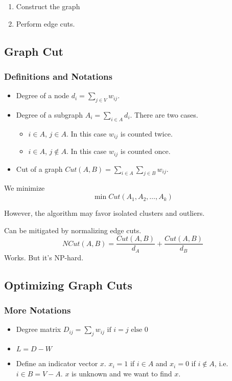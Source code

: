         \begin{enumerate}
            \item Construct the graph
            \item Perform edge cuts.
        \end{enumerate}

    \subsection{Graph Cut}
        \subsubsection{Definitions and Notations}
            \begin{itemize}
                \item Degree of a node $d_i = \sum_{j\in V}w_{ij}$.
                \item Degree of a subgraph $A_i = \sum_{i \in A}d_i$. There are two cases.
                    \begin{itemize}
                        \item $i \in A$, $j \in A$. In this case $w_{ij}$ is counted twice.
                        \item $i \in A$, $j \notin A$. In this case $w_{ij}$ is counted once.
                    \end{itemize}
                \item Cut of a graph $Cut(A, B) = \sum_{i \in A}\sum_{j \in B}w_{ij}$.
            \end{itemize}

        We minimize
        \[ \min Cut(A_1,A_2,\dots,A_k) \]

        However, the algorithm may favor isolated clusters and outliers.

        Can be mitigated by normalizing edge cuts.
        \[ NCut(A,B) = \frac{Cut(A,B)}{d_A} + \frac{Cut(A,B)}{d_B}\]
        Works. But it's NP-hard.

    \subsection{Optimizing Graph Cuts}
        \subsubsection{More Notations}
            \begin{itemize}
                \item Degree matrix $D_{ij} = \text{$\sum_j w_{ij}$ if $i=j$ else $0$}$
                \item $L=D-W$
                \item Define an indicator vector $x$. $x_i = 1$ if $i \in A$ and $x_i=0$ if $i \notin A$, i.e. $i \in B = V-A$. $x$ is unknown and we want to find $x$.
            \end{itemize}

